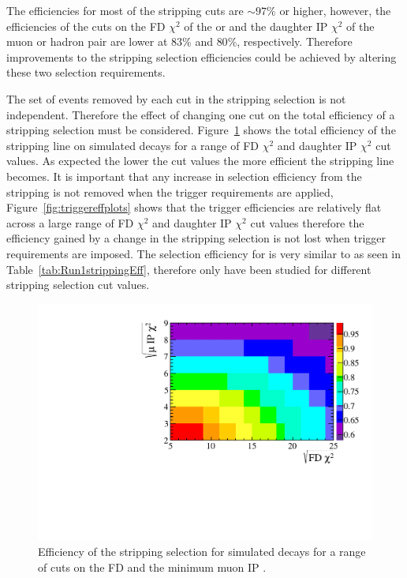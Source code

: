 The efficiencies for most of the stripping cuts are $\sim 97 \%$ or higher, however, the efficiencies of the cuts on the FD $\chi^{2}$ of the \bsd or \jpsi and the daughter IP $\chi^{2}$ of the muon or hadron pair are lower at $83 \%$ and $80 \%$, respectively. Therefore improvements to the stripping selection efficiencies could be achieved by altering these two selection requirements. 



The set of events removed by each cut in the stripping selection is not independent. Therefore the effect of changing one cut on the total efficiency of a stripping selection must be considered. Figure~\ref{fig:efficiencyplots} shows the total efficiency of the \bsmumu stripping line on simulated \bsmumu decays for a range of FD $\chi^{2}$ and daughter IP $\chi^{2}$ cut values. As expected the lower the cut values the more efficient the stripping line becomes. It is important that any increase in \bsmumu selection efficiency from the stripping is not removed when the trigger requirements are applied, Figure~\ref{fig:triggereffplots} shows that the trigger efficiencies are relatively flat across a large range of FD $\chi^{2}$ and daughter IP $\chi^{2}$ cut values therefore the efficiency gained by a change in the stripping selection is not lost when trigger requirements are imposed. The selection efficiency for \bdmumu is very similar to \bsmumu as seen in Table~\ref{tab:Run1strippingEff}, therefore only \bsmumu have been studied for different stripping selection cut values. 


\begin{figure}[tbp]
    \centering
        \includegraphics[width= 0.8 \textwidth]{./Figs/Selection/Bs2MuMu_efficiency_chart_Feb3.pdf}
    \caption{Efficiency of the \bmumu stripping selection for \bsmumu simulated decays for a range of cuts on the \bs FD \chisqd and the minimum muon IP \chisqd.}
    \label{fig:efficiencyplots}
\end{figure}

